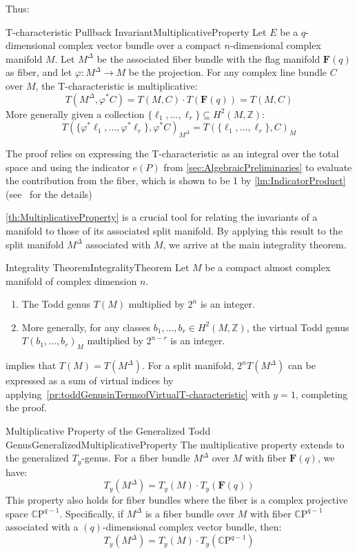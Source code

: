 \documentclass{ut-thesis}
\newenvironment{Proof}[1][]
  {\begin{ProofTcb}[#1]}
  {\end{ProofTcb}}
\newcommand{\Z}{{\mathbb{Z}}}
\newcommand{\CP}{{\mathbb{C}\mathrm{P}}}
\newcommand{\sse}{\subseteq}
\renewcommand{\phi}{\varphi}
\begin{document}
Thus:
\begin{thm}{T-characteristic Pullback Invariant}{MultiplicativeProperty}
Let $E$ be a $q$-dimensional complex vector bundle over a compact $n$-dimensional complex manifold $M$. Let $M^\Delta$ be the associated fiber bundle with the flag manifold $\mathbf{F}(q)$ as fiber, and let $\phi: M^\Delta \to M$ be the projection. For any complex line bundle $C$ over $M$, the T-characteristic is multiplicative:
\[
T(M^\Delta, \phi^* C) = T(M, C) \cdot T(\mathbf{F}(q)) = T(M, C)
\]
More generally given a collection $\{\ell_1, ..., \ell_r\} \sse H^2(M, \Z)$:
\[
T(\{\phi^*\ell_1, \dots, \phi^*\ell_r\}, \phi^*C)_{M^\Delta} = T(\{\ell_1, \dots, \ell_r\}, C)_M
\]
\end{thm}
\begin{Proof}
The proof relies on expressing the T-characteristic as an integral over the total space and using the
indicator $e(P)$ from \cref{sec:AlgebraicPreliminaries} to evaluate the contribution from the fiber, which is
shown to be 1 by \cref{lm:IndicatorProduct} (see~\cite{hirzebruchTopologicalMethodsAlgebraic1995} for the
details)
\end{Proof}

\cref{th:MultiplicativeProperty} is a crucial tool for relating the invariants of a manifold to those of its associated split manifold. By applying this result to the split manifold $M^\Delta$ associated with $M$, we arrive at the main integrality theorem.

\begin{thm}{Integrality Theorem}{IntegralityTheorem}
Let $M$ be a compact almost complex manifold of complex dimension $n$.
\begin{enumerate}
    \item The Todd genus $T(M)$ multiplied by $2^n$ is an integer.
    \item More generally, for any classes $b_1, \dots, b_r \in H^2(M, \mathbb{Z})$, the virtual Todd genus $T(b_1, \dots, b_r)_M$ multiplied by $2^{n-r}$ is an integer.
\end{enumerate}
\end{thm}
\begin{Proof}
   implies that $T(M) = T(M^\Delta)$. For a split manifold, $2^n T(M^\Delta)$
  can be expressed as a sum of virtual indices by applying~\cref{pr:toddGenusinTermsofVirtualT-characteristic}
  with $y =1$, completing the proof.
\end{Proof}

\begin{thm}{Multiplicative Property of the Generalized Todd Genus}{GeneralizedMultiplicativeProperty}
The multiplicative property extends to the generalized $T_y$-genus. For a fiber bundle $M^\Delta$ over $M$ with fiber $\mathbf{F}(q)$, we have:
\[
T_y(M^\Delta) = T_y(M) \cdot T_y(\mathbf{F}(q))
\]
This property also holds for fiber bundles where the fiber is a complex projective space $\CP^{q-1}$.
Specifically, if $M^\Delta$ is a fiber bundle over $M$ with fiber $\CP^{q-1}$ associated with a
$(q)$-dimensional complex vector bundle, then:
\[
  T_y(M^\Delta) = T_y(M) \cdot T_y(\CP^{q-1})
\]
\end{thm}
\end{document}
